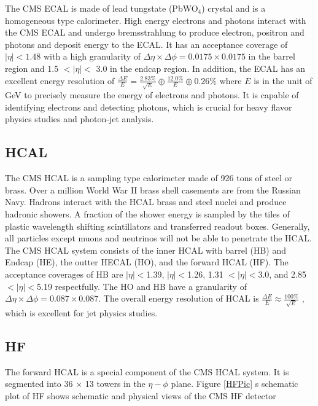 The CMS ECAL is made of lead tungstate (PbWO$_4$) crystal and is a homogeneous type calorimeter. High energy electrons and photons interact with the CMS ECAL and undergo bremsstrahlung to produce electron, positron and photons and deposit energy to the ECAL. It has an acceptance coverage of $|\eta| < 1.48$ with a high granularity of $\Delta \eta \times \Delta \phi = 0.0175 \times 0.0175$ in the barrel region and 1.5 $< |\eta| <$ 3.0 in the endcap region. In addition, the ECAL has an excellent energy resolution of $\frac{\Delta E}{E} = \frac{2.83\%}{\sqrt {E}} \oplus \frac{12.0\%}{E}  \oplus 0.26\%$ where $E$ is in the unit of GeV \cite{ECALReso} to precisely measure the energy of electrons and photons. It is capable of identifying electrons and detecting photons, which is crucial for heavy flavor physics studies and photon-jet analysis. 

\subsection{HCAL}

The CMS HCAL is a sampling type calorimeter made of 926 tons of steel or brass. Over a million World War II brass shell casements are from the Russian Navy. Hadrons interact with the HCAL brass and steel nuclei and produce hadronic showers. A fraction of the shower energy is sampled by the tiles of plastic wavelength shifting scintillators and transferred readout boxes. Generally, all particles except muons and neutrinos will not be able to penetrate the HCAL. The CMS HCAL system consists of the inner HCAL with barrel (HB) and Endcap (HE), the outter HECAL (HO), and the forward HCAL (HF). The acceptance coverages of HB are $|\eta| < $1.39, $|\eta| < $1.26, 1.31 $< |\eta| < $3.0, and 2.85 $< |\eta| < $5.19 respectfully. The HO and HB have a granularity of $\Delta \eta \times \Delta \phi = 0.087 \times 0.087$. The overall energy resolution of HCAL is $\frac{\Delta E}{E} \approx \frac{100\%}{\sqrt {E}}$ \cite{HCALReport}, which is excellent for jet physics studies.

\subsection{HF}

The forward HCAL is a special component of the CMS HCAL system. It is segmented into 36 $\times$ 13 towers in the $\eta - \phi$ plane. Figure \ref{HFPic} s schematic plot of HF shows schematic and physical views of the CMS HF detector \cite{HFInfo}

